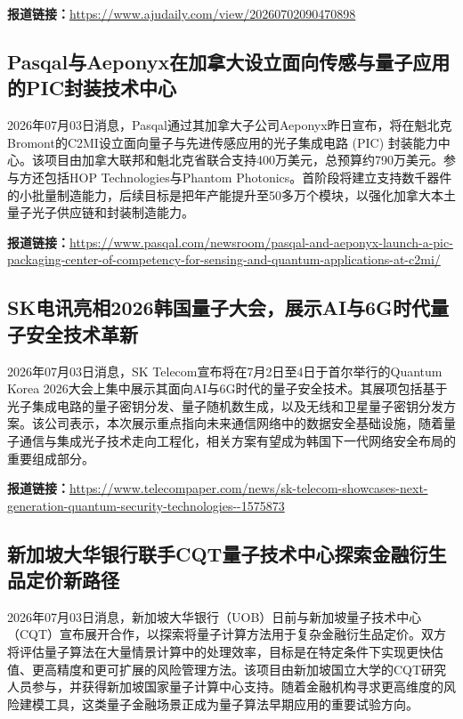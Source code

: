 \documentclass[12pt,a4paper]{ctexart}
\begin{document}
\noindent\textbf{报道链接：}\url{https://www.ajudaily.com/view/20260702090470898}

\subsection{ Pasqal与Aeponyx在加拿大设立面向传感与量子应用的PIC封装技术中心 }

2026年07月03日消息，Pasqal通过其加拿大子公司Aeponyx昨日宣布，将在魁北克Bromont的C2MI设立面向量子与先进传感应用的光子集成电路 (PIC) 封装能力中心。该项目由加拿大联邦和魁北克省联合支持400万美元，总预算约790万美元。参与方还包括HOP Technologies与Phantom Photonics。首阶段将建立支持数千器件的小批量制造能力，后续目标是把年产能提升至50多万个模块，以强化加拿大本土量子光子供应链和封装制造能力。

\noindent\textbf{报道链接：}\url{https://www.pasqal.com/newsroom/pasqal-and-aeponyx-launch-a-pic-packaging-center-of-competency-for-sensing-and-quantum-applications-at-c2mi/}

\subsection{ SK电讯亮相2026韩国量子大会，展示AI与6G时代量子安全技术革新 }

2026年07月03日消息，SK Telecom宣布将在7月2日至4日于首尔举行的Quantum Korea 2026大会上集中展示其面向AI与6G时代的量子安全技术。其展项包括基于光子集成电路的量子密钥分发、量子随机数生成，以及无线和卫星量子密钥分发方案。该公司表示，本次展示重点指向未来通信网络中的数据安全基础设施，随着量子通信与集成光子技术走向工程化，相关方案有望成为韩国下一代网络安全布局的重要组成部分。

\noindent\textbf{报道链接：}\url{https://www.telecompaper.com/news/sk-telecom-showcases-next-generation-quantum-security-technologies--1575873}

\subsection{ 新加坡大华银行联手CQT量子技术中心探索金融衍生品定价新路径 }

2026年07月03日消息，新加坡大华银行（UOB）日前与新加坡量子技术中心（CQT）宣布展开合作，以探索将量子计算方法用于复杂金融衍生品定价。双方将评估量子算法在大量情景计算中的处理效率，目标是在特定条件下实现更快估值、更高精度和更可扩展的风险管理方法。该项目由新加坡国立大学的CQT研究人员参与，并获得新加坡国家量子计算中心支持。随着金融机构寻求更高维度的风险建模工具，这类量子金融场景正成为量子算法早期应用的重要试验方向。
\end{document}
